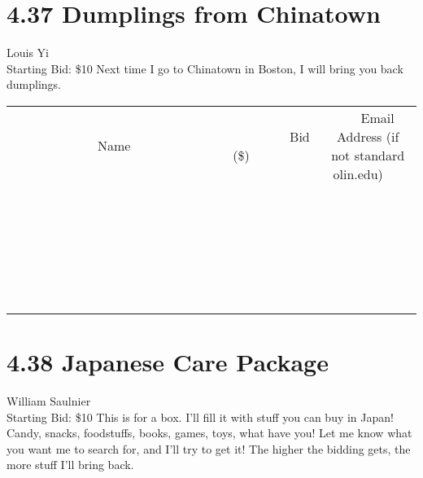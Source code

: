 \documentclass[11pt]{article}
\begin{document}
\section*{4.37 Dumplings from Chinatown}
Louis Yi
\\
Starting Bid: \$10
\newline
Next time I go to Chinatown in Boston, I will bring you back dumplings.
\\[6ex]
\begin{tabular}{c c c}
~~~~~~~~~~~~~Name~~~~~~~~~~~~~ & ~~~~~~~~~Bid (\$)~~~~~~~~~  & ~~~Email Address (if not standard olin.edu)~~~\\
 & & \\
\hline
 & & \\
\hline
 & & \\
\hline
 & & \\
\hline
 & & \\
\hline
 & & \\
\hline
 & & \\
\hline
 & & \\
\hline
 & & \\
\hline
 & & \\
\hline
 & & \\
\hline
 & & \\
\hline
 & & \\
\hline
 & & \\
\hline
 & & \\
\hline
 & & \\
\hline
 & & \\
\hline
 & & \\
\hline
 & & \\
\hline
 & & \\
\hline
 & & \\
\hline
 & & \\
\hline
 & & \\
\hline
 & & \\
\hline
 & & \\
\hline
 & & \\
\hline
\end{tabular}
\newpage
\section*{4.38 Japanese Care Package}
William Saulnier
\\
Starting Bid: \$10
\newline
This is for a box. I'll fill it with stuff you can buy in Japan! Candy, snacks, foodstuffs, books, games, toys, what have you! Let me know what you want me to search for, and I'll try to get it! The higher the bidding gets, the more stuff I'll bring back.
\end{document}

